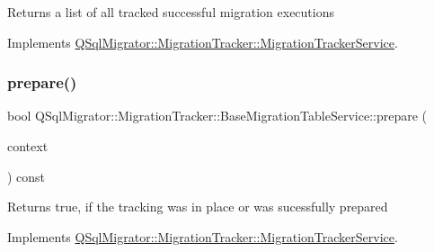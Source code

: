 \begin{DoxyReturn}{Returns}
a list of all tracked successful migration executions 
\end{DoxyReturn}


Implements \hyperlink{class_q_sql_migrator_1_1_migration_tracker_1_1_migration_tracker_service_a5de22e070fc1b4f487dbe256e1c874ef}{Q\+Sql\+Migrator\+::\+Migration\+Tracker\+::\+Migration\+Tracker\+Service}.

\mbox{\label{class_q_sql_migrator_1_1_migration_tracker_1_1_base_migration_table_service_a76bec328f72c8fc91002cc285731332c}} 
\subsubsection{\texorpdfstring{prepare()}{prepare()}}
{\footnotesize\ttfamily bool Q\+Sql\+Migrator\+::\+Migration\+Tracker\+::\+Base\+Migration\+Table\+Service\+::prepare (\begin{DoxyParamCaption}\item[{const \hyperlink{class_q_sql_migrator_1_1_migration_execution_1_1_migration_execution_context}{Migration\+Execution\+::\+Migration\+Execution\+Context} \&}]{context }\end{DoxyParamCaption}) const\hspace{0.3cm}{\ttfamily [virtual]}}

\begin{DoxyReturn}{Returns}
true, if the tracking was in place or was sucessfully prepared 
\end{DoxyReturn}


Implements \hyperlink{class_q_sql_migrator_1_1_migration_tracker_1_1_migration_tracker_service_a26dc17b23f3e2a62c9964ce46c740b57}{Q\+Sql\+Migrator\+::\+Migration\+Tracker\+::\+Migration\+Tracker\+Service}.

\mbox{\label{class_q_sql_migrator_1_1_migration_tracker_1_1_base_migration_table_service_a2b0bf914a7672e5540b7b003cd378aaf}} 
